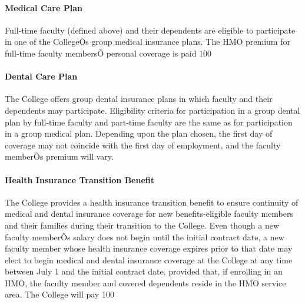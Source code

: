 \documentclass[letterpaper, 11pt]{article}
\begin{document}
			\paragraph{Medical Care Plan}
				Full-time faculty (defined above) and their dependents are eligible to participate in one of the CollegeÕs group medical insurance plans.  The HMO premium for full-time faculty membersÕ personal coverage is paid 100%
			\paragraph{Dental Care Plan}
				The College offers group dental insurance plans in which faculty and their dependents may participate.  Eligibility criteria for participation in a group dental plan by full-time faculty and part-time faculty are the same as for participation in a group medical plan.  Depending upon the plan chosen, the first day of coverage may not coincide with the first day of employment, and the faculty memberÕs premium will vary.
			\paragraph{Health Insurance Transition Benefit}
				The College provides a health insurance transition benefit to ensure continuity of medical and dental insurance coverage for new benefits-eligible faculty members and their families during their transition to the College.  Even though a new faculty memberÕs salary does not begin until the initial contract date, a new faculty member whose health insurance coverage expires prior to that date may elect to begin medical and dental insurance coverage at the College at any time between July 1 and the initial contract date, provided that, if enrolling in an HMO, the faculty member and covered dependents reside in the HMO service area.  The College will pay 100%
\end{document}

